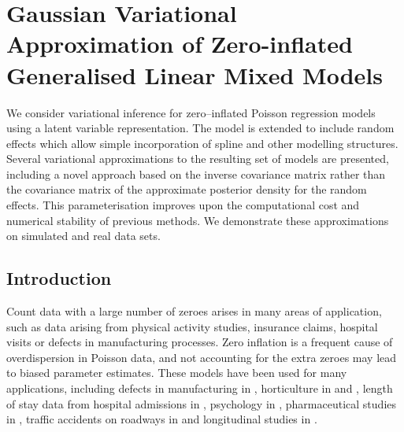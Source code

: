 \chapter{Gaussian Variational Approximation of Zero-inflated Generalised
         Linear Mixed Models}


\noindent
    
We consider variational inference for zero--inflated Poisson
regression models using a latent variable representation. The model is
extended to include random effects which allow simple incorporation of
spline and other modelling structures. Several variational approximations
to the resulting set of models are presented, including a novel approach
based on the inverse covariance matrix rather than the covariance matrix of
the approximate posterior density for the random effects. This
parameterisation improves upon the computational cost and numerical
stability of previous methods. We demonstrate these approximations on
simulated and real data sets.


\newpage
 


\section{Introduction}
\label{sec:introduction}

Count data with a large number of zeroes arises in many areas of application,
such as data arising from physical activity studies, insurance claims, hospital
visits or defects in manufacturing processes. Zero inflation is a frequent
cause of overdispersion in Poisson data, and not accounting for the extra
zeroes may lead to biased parameter estimates. These models have been used for
many applications, including defects in manufacturing in \cite{lambert1992},
horticulture in \cite{BIOM:BIOM1030} and \cite{BIOM:BIOM1030}, length of stay
data from hospital admissions in \cite{BIMJ:BIMJ200390024}, psychology in
\cite{JOFP:rethink}, pharmaceutical studies in \cite{Min01042005}, traffic
accidents on roadways in \cite{Shankar1997829} and longitudinal studies in
\cite{LeeWangScottYauMcLachlan2006}.

